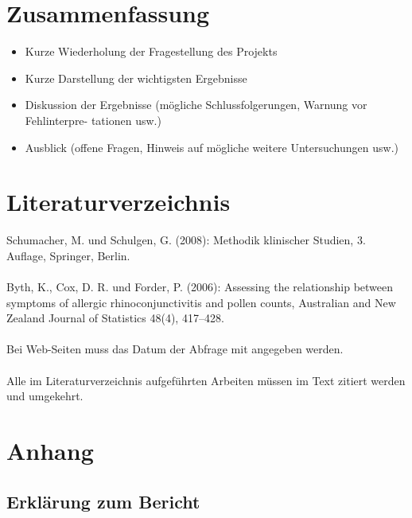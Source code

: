 \documentclass[a4paper,12pt]{article}
\begin{document}
\section{Zusammenfassung}
\begin{itemize}
\item Kurze Wiederholung der Fragestellung des Projekts
\item Kurze Darstellung der wichtigsten Ergebnisse
\item Diskussion der Ergebnisse (mögliche Schlussfolgerungen, Warnung vor Fehlinterpre-
tationen usw.)
\item Ausblick (offene Fragen, Hinweis auf mögliche weitere Untersuchungen usw.)
\end{itemize}


\section*{Literaturverzeichnis} %
Schumacher, M. und Schulgen, G. (2008): Methodik klinischer Studien, 3. Auflage,
Springer, Berlin.\\
\\
Byth, K., Cox, D. R. und Forder, P. (2006): Assessing the relationship between symptoms of allergic rhinoconjunctivitis and pollen counts, Australian and New Zealand Journal of Statistics 48(4), 417–428.\\
\\
Bei Web-Seiten muss das Datum der Abfrage mit angegeben werden.\\
\\
Alle im Literaturverzeichnis aufgeführten Arbeiten müssen im Text zitiert werden
und umgekehrt.\\

\appendix
\newpage
\section*{Anhang}
\renewcommand{\thesubsection}{\Alph{subsection}}

\subsection{Erklärung zum Bericht}
\end{document}
